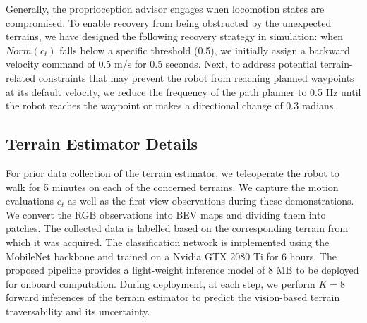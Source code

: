 \documentclass[conference]{IEEEtran}
\begin{document}
Generally, the proprioception advisor engages when locomotion states are compromised. To enable recovery from being obstructed by the unexpected terrains, we have designed the following recovery strategy in simulation: when $Norm(c_{t})$ falls below a specific threshold (0.5), we initially assign a backward velocity command of 0.5 m/s for 0.5 seconds. Next, to address potential terrain-related constraints that may prevent the robot from reaching planned waypoints at its default velocity, we reduce the frequency of the path planner to 0.5 Hz until the robot reaches the waypoint or makes a directional change of 0.3 radians. 

\subsection{Terrain Estimator Details}

For prior data collection of the terrain estimator, we teleoperate the robot to walk for 5 minutes on each of the concerned terrains. We capture the motion evaluations $c_t$ as well as the first-view observations during these demonstrations. We convert the RGB observations into BEV maps and dividing them into patches. The collected data is labelled based on the corresponding terrain from which it was acquired. The classification network is implemented using the MobileNet backbone and trained on a Nvidia GTX 2080 Ti for 6 hours. The proposed pipeline provides a light-weight inference model of 8 MB to be deployed for onboard computation. During deployment, at each step, we perform $K=8$ forward inferences of the terrain estimator to predict the vision-based terrain traversability and its uncertainty.
\end{document}
